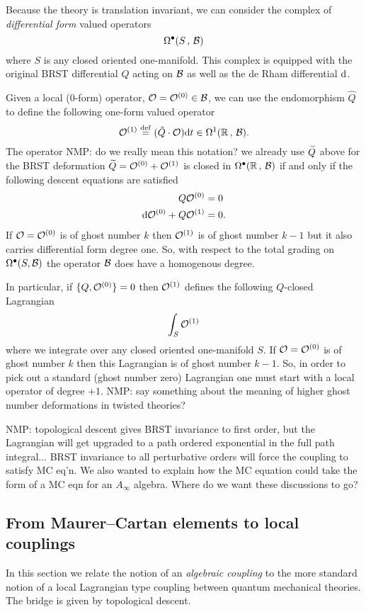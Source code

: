 \documentclass[11pt]{amsart}
\def\natalie#1{{\textcolor{green!65!black}{NMP: {#1}}}}
\begin{document}
Because the theory is translation invariant, we can consider the complex of {\em differential form} valued operators
\[
\Omega^\bullet(S \, , \, \mathcal B) 
\]
where $S$ is any closed oriented one-manifold. 
This complex is equipped with the original BRST differential $Q$ acting on $\mathcal B$ as well as the de Rham differential ${\rm d}$. 

Given a local (0-form) operator, $\mathcal O = \mathcal O^{(0)} \in \mathcal B$, we can use the endomorphism $\hat{Q}$ to define the following one-form valued operator
\[
\mathcal O^{(1)} \overset{\rm def}{=} (\hat{Q} \cdot \mathcal O) {\rm d} t \in \Omega^1(\mathbb R \, , \, \mathcal B).
\]
The operator \natalie{do we really mean this notation? we already use $\widetilde{Q}$ above for the BRST deformation} $\widetilde{Q} = \mathcal O^{(0)} + \mathcal O^{(1)}$ is closed in $\Omega^\bullet(\mathbb R \, , \, \mathcal B)$ if and only if the following descent equations are satisfied 
\begin{align*}
Q \mathcal O^{(0)} & = 0 \\
{\rm d} \mathcal O^{(0)} + Q \mathcal O^{(1)} & = 0 .
\end{align*}
If $\mathcal O = \mathcal O^{(0)}$ is of ghost number $k$ then $\mathcal O^{(1)}$ is of ghost number $k-1$ but it also carries differential form degree one. 
So, with respect to the total grading on $\Omega^\bullet(S, \mathcal B)$ the operator $\mathcal B$ does have a homogenous degree.

In particular, if $\{Q,\mathcal O^{(0)}\} = 0$ then $\mathcal O^{(1)}$ defines the following $Q$-closed Lagrangian
\[
\int_S \mathcal O^{(1)} 
\]
where we integrate over any closed oriented one-manifold $S$.
If $\mathcal O = \mathcal O^{(0)}$ is of ghost number $k$ then this Lagrangian is of ghost number $k-1$. 
So, in order to pick out a standard (ghost number zero) Lagrangian one must start with a local operator of degree $+1$. \natalie{say something about the meaning of higher ghost number deformations in twisted theories?}

\natalie{topological descent gives BRST invariance to first order, but the Lagrangian will get upgraded to a path ordered exponential in the full path integral... BRST invariance to all perturbative orders will force the coupling to satisfy MC eq'n. We also wanted to explain how the MC equation could take the form of a MC eqn for an $A_{\infty}$ algebra. Where do we want these discussions to go?}


\subsection{From Maurer--Cartan elements to local couplings} 

In this section we relate the notion of an {\em algebraic coupling} to the more standard notion of a local Lagrangian type coupling between quantum mechanical theories. 
The bridge is given by topological descent. 
\end{document}
